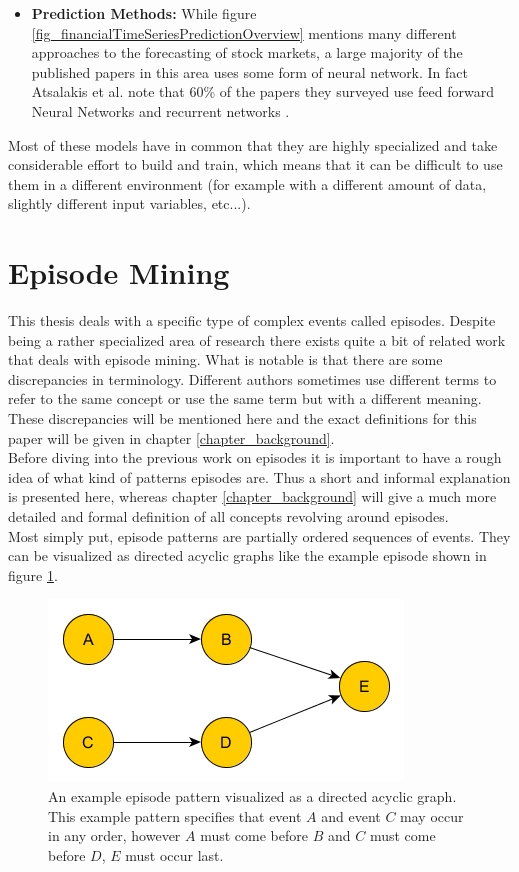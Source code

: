 \begin{itemize}
	\item \textbf{Prediction Methods:} While figure \ref{fig_financialTimeSeriesPredictionOverview} mentions many different approaches to the forecasting of stock markets, a large majority of the published papers in this area uses some form of neural network. In fact Atsalakis et al. note that 60\% of the papers they surveyed use feed forward Neural Networks and recurrent networks \cite{atsalakis2009surveying}. 
\end{itemize}

Most of these models have in common that they are highly specialized and take considerable effort to build and train, which means that it can be difficult to use them in a different environment (for example with a different amount of data, slightly different input variables, etc...).

\section{Episode Mining}
\label{sec_episodes}
This thesis deals with a specific type of complex events called episodes. Despite being a rather specialized area of research there exists quite a bit of related work that deals with episode mining. What is notable is that there are some discrepancies in terminology. Different authors sometimes use different terms to refer to the same concept or use the same term but with  a different meaning. These discrepancies will be mentioned here and the exact definitions for this paper will be given in chapter \ref{chapter_background}. \\
Before diving into the previous work on episodes it is important to have a rough idea of what kind of patterns episodes are. Thus a short and informal explanation is presented here, whereas chapter \ref{chapter_background} will give a much more detailed and formal definition of all concepts revolving around episodes. \\
Most simply put, episode patterns are partially ordered sequences of events. They can be visualized as directed acyclic graphs like the example episode shown in figure \ref{fig_exampleCompositeEpisode}. 

\begin{figure}[h]
	\centering
  	\includegraphics[width=.4\textwidth]{exampleCompositeEpisode}
	\caption[Example Composite Episode]{An example episode pattern visualized as a directed acyclic graph. This example pattern specifies that event $A$ and event $C$ may occur in any order, however $A$ must come before $B$ and $C$ must come before $D$, $E$ must occur last.}
	\label{fig_exampleCompositeEpisode}
\end{figure}

